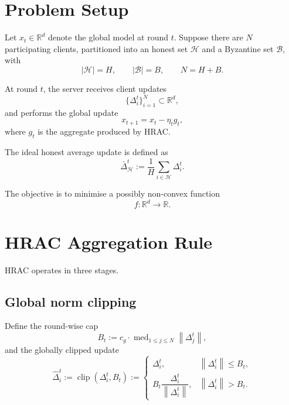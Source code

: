 \documentclass[11pt,a4paper]{article}
\theoremstyle{remark}
\newcommand{\R}{\mathbb{R}}
\newcommand{\HH}{\mathcal{H}}
\newcommand{\BB}{\mathcal{B}}
\newcommand{\clip}{\operatorname{clip}}
\newcommand{\med}{\operatorname{med}}
\newcommand{\norm}[1]{\left\lVert #1 \right\rVert}
\begin{document}
\section{Problem Setup}

Let \(x_t \in \R^d\) denote the global model at round \(t\).
Suppose there are \(N\) participating clients, partitioned into an honest set
\(\HH\) and a Byzantine set \(\BB\), with
\[
    |\HH| = H, \qquad |\BB| = B, \qquad N = H + B.
\]

At round \(t\), the server receives client updates
\[
    \{\Delta_i^t\}_{i=1}^N \subset \R^d,
\]
and performs the global update
\begin{equation}
    x_{t+1} = x_t - \eta_t g_t,
    \label{eq:server_update}
\end{equation}
where \(g_t\) is the aggregate produced by HRAC.

The ideal honest average update is defined as
\begin{equation}
    \bar{\Delta}_{\HH}^t
    :=
    \frac{1}{H} \sum_{i \in \HH} \Delta_i^t.
    \label{eq:honest_average}
\end{equation}

The objective is to minimise a possibly non-convex function
\[
    f : \R^d \to \R.
\]

\section{HRAC Aggregation Rule}

HRAC operates in three stages.

\subsection{Global norm clipping}

Define the round-wise cap
\begin{equation}
    B_t := c_g \cdot \med_{1 \le j \le N} \norm{\Delta_j^t},
    \label{eq:global_cap}
\end{equation}
and the globally clipped update
\begin{equation}
    \hat{\Delta}_i^t
    :=
    \clip(\Delta_i^t, B_t)
    :=
    \begin{cases}
        \Delta_i^t, & \norm{\Delta_i^t} \le B_t,\\[2mm]
        B_t \dfrac{\Delta_i^t}{\norm{\Delta_i^t}}, & \norm{\Delta_i^t} > B_t.
    \end{cases}
    \label{eq:global_clip}
\end{equation}
\end{document}
